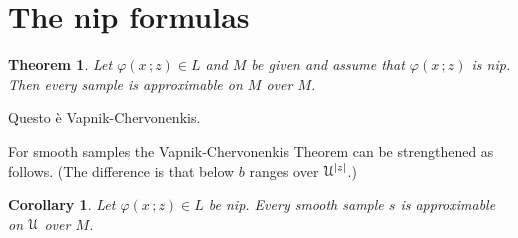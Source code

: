 \documentclass[10pt,openany]{article}
\newcommand{\sbar}[1]{\mkern 1.8mu\overline{\mkern-1.8mu#1\mkern-1mu}\mkern 1mu}
\def\U{\EuScript U}
\def\phi{\varphi}
\newcounter{thm}[section]
\theoremstyle{mio}
\newtheorem{theorem}[thm]{Theorem}
\newtheorem{corollary}[thm]{Corollary}
\newtheorem{definition}[thm]{Definition}
\theoremstyle{liscio}
\def\QED{\noindent\nolinebreak[4]\hspace{\stretch{1}}\rlap{\ \ $\Box$}\medskip}
\renewenvironment{proof}[1][Proof]%
{\begin{trivlist}\item[\hskip\labelsep {\bf #1}]}
{\QED\end{trivlist}}
\renewcommand*{\emph}[1]{%
   \kern-0.2ex 
   \smash{\tikz[baseline]
   \node[ rectangle, fill=emphcolor, rounded corners, 
          inner xsep=.3ex, inner ysep=.2ex, anchor=base,
          minimum height = 3ex
         ]{#1};
   }
   \kern-1.2ex 
}
\begin{document}


  



\section{The nip formulas}\label{nip}

\begin{theorem}\label{thm_VC}
  Let $\phi(x\,;z)\in L$ and $M$ be given and assume that $\phi(x\,;z)$ is nip.
  Then every sample is approximable on $M$ over $M$.
\end{theorem}

\begin{proof}
  Questo è Vapnik-Chervonenkis.
\end{proof}

For smooth samples the Vapnik-Chervonenkis Theorem can be strengthened as follows. (The difference is that below $b$ ranges over $\U^{|z|}$.)

\begin{corollary}
  Let  $\phi(x\,;z)\in L$ be nip.
  Every smooth sample $s$ is approximable on $\U$ over $M$.
\end{corollary}
\end{document}
